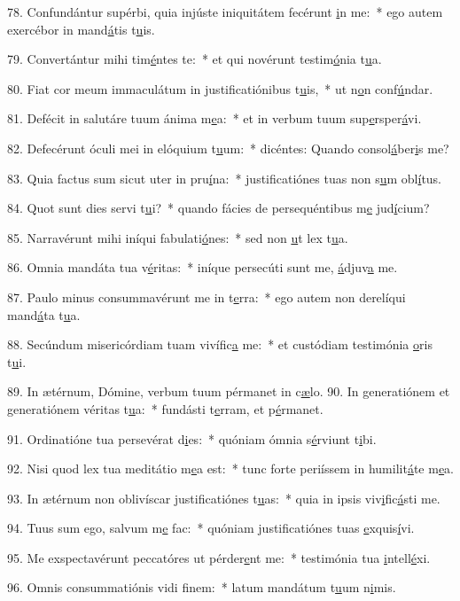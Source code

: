 78. Confundántur supérbi, quia injúste iniquitátem fecérunt \uline{i}n me:~* ego autem exercébor in mand\uline{á}tis t\uline{u}is.\par 
79. Convertántur mihi tim\uline{é}ntes te:~* et qui novérunt testim\uline{ó}nia t\uline{u}a.\par 
80. Fiat cor meum immaculátum in justificatiónibus t\uline{u}is,~* ut n\uline{o}n conf\uline{ú}ndar.\par 
81. Defécit in salutáre tuum ánima m\uline{e}a:~* et in verbum tuum sup\uline{e}rsper\uline{á}vi.\par 
82. Defecérunt óculi mei in elóquium t\uline{u}um:~* dicéntes: Quando consol\uline{á}ber\uline{i}s me?\par 
83. Quia factus sum sicut uter in pru\uline{í}na:~* justificatiónes tuas non s\uline{u}m obl\uline{í}tus.\par 
84. Quot sunt dies servi t\uline{u}i?~* quando fácies de persequéntibus m\uline{e} jud\uline{í}cium?\par 
85. Narravérunt mihi iníqui fabulati\uline{ó}nes:~* sed non \uline{u}t lex t\uline{u}a.\par 
86. Omnia mandáta tua v\uline{é}ritas:~* iníque persecúti sunt me, \uline{á}djuv\uline{a} me.\par 
87. Paulo minus consummavérunt me in t\uline{e}rra:~* ego autem non derelíqui mand\uline{á}ta t\uline{u}a.\par 
88. Secúndum misericórdiam tuam vivífic\uline{a} me:~* et custódiam testimónia \uline{o}ris t\uline{u}i.\par 
89. In ætérnum, Dómine, verbum tuum pérmanet in c\uline{æ}lo.
90. In generatiónem et generatiónem véritas t\uline{u}a:~* fundásti t\uline{e}rram, et p\uline{é}rmanet.\par 
91. Ordinatióne tua persevérat d\uline{i}es:~* quóniam ómnia s\uline{é}rviunt t\uline{i}bi.\par 
92. Nisi quod lex tua meditátio m\uline{e}a est:~* tunc forte periíssem in humilit\uline{á}te m\uline{e}a.\par 
93. In ætérnum non oblivíscar justificatiónes t\uline{u}as:~* quia in ipsis viv\uline{i}fic\uline{á}sti me.\par 
94. Tuus sum ego, salvum m\uline{e} fac:~* quóniam justificatiónes tuas \uline{e}xquis\uline{í}vi.\par 
95. Me exspectavérunt peccatóres ut pérder\uline{e}nt me:~* testimónia tua \uline{i}ntell\uline{é}xi.\par 
96. Omnis consummatiónis vidi f\uline{i}nem:~* latum mandátum t\uline{u}um n\uline{i}mis.\par 
